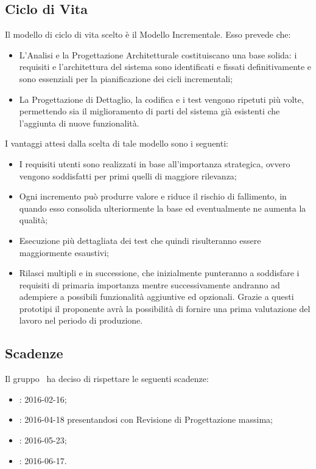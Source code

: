 \subsection{Ciclo di Vita}
Il modello di ciclo di vita scelto è il Modello Incrementale. Esso prevede che:
\begin{itemize}
	\item L'Analisi e la Progettazione Architetturale costituiscano una base solida: i requisiti e l'architettura del sistema sono identificati e fissati definitivamente e sono essenziali per la pianificazione dei cicli incrementali;
	\item La Progettazione di Dettaglio, la codifica e i test vengono ripetuti più volte, permettendo sia il miglioramento di parti del sistema già esistenti che l'aggiunta di nuove funzionalità.
\end{itemize}
I vantaggi attesi dalla scelta di tale modello sono i seguenti:
\begin{itemize}
	\item I requisiti utenti sono realizzati in base all'importanza strategica, ovvero vengono soddisfatti per primi quelli di maggiore rilevanza;
	\item Ogni incremento può produrre valore e riduce il rischio di fallimento, in quando esso consolida ulteriormente la base ed eventualmente ne aumenta la qualità;
	\item Esecuzione più dettagliata dei test che quindi risulteranno essere maggiormente esaustivi;
	\item Rilasci multipli e in successione, che inizialmente punteranno a soddisfare i requisiti di primaria importanza mentre successivamente andranno ad adempiere a possibili funzionalità aggiuntive ed opzionali. Grazie a questi prototipi il proponente avrà la possibilità di fornire una prima valutazione del lavoro nel periodo di produzione.
\end{itemize}
\subsection{Scadenze}
Il gruppo \gruppo\ ha deciso di rispettare le seguenti scadenze:
\begin{itemize}
	\item \textbf{\RR}: 2016-02-16;
	\item \textbf{\RP}: 2016-04-18 presentandosi con Revisione di Progettazione massima;
	\item \textbf{\RQ}: 2016-05-23;
	\item \textbf{\RA}: 2016-06-17.
\end{itemize}
